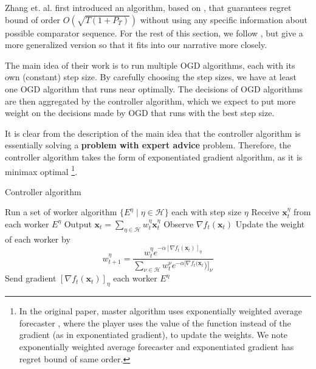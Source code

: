 \documentclass[12pt, a4paper]{report}
\begin{document}
Zhang et. al. \cite{Zhang2018DynamicRO} first introduced an algorithm, based on  \cite{Erven2021MetaGradAU}, that guarantees regret bound of order $O(\sqrt{T(1 + P_T)})$ without using any specific information about possible comparator sequence. For the rest of this section, we follow \cite{Zhang2018DynamicRO}, but give a more generalized version so that it fits into our narrative more closely.

The main idea of their work is to run multiple OGD algorithms, each with its own (constant) step size. By carefully choosing the step sizes, we have at least one OGD algorithm that runs near optimally. The decisions of OGD algorithms are then aggregated by the controller algorithm, which we expect to put more weight on the decisions made by OGD that runs with the best step size. 

It is clear from the description of the main idea that the controller algorithm is essentially solving a \textbf{problem with expert advice} problem. Therefore, the controller algorithm takes the form of exponentiated gradient algorithm, as it is minimax optimal \footnote{In the original paper, master algorithm uses exponentially weighted average forecaster \cite{CesaBianchi2006PredictionLA}, where the player uses the value of the function instead of the gradient (as in exponentiated gradient), to update the weights. We note exponentially weighted average forecaster and exponentiated gradient has regret bound of same order.}.

\begin{algorithm}
\caption{Controller algorithm}\label{ader:controller}
\begin{algorithmic}[1]
\State Run a set of worker algorithm $\{E^{\eta} \mid \eta \in \mathcal{H} \}$ each with step size $\eta$ 
\State Receive $\mathbf{x}_t^{\eta}$ from each worker $E^{\eta}$
\State Output $\displaystyle \mathbf{x}_t = \sum_{\eta \in \mathcal{H}} w_{t}^{\eta} \mathbf{x}_t^{\eta}$
\State Observe $\nabla f_t(\mathbf{x}_t)$
\State Update the weight of each worker by \[
    w_{t+1}^{\eta} = \frac{w_t^{\eta}e^{-\alpha [\nabla f_t(\mathbf{x}_t)]_{\eta}}}{\sum_{\nu \in \mathcal{H}}w_t^{\nu}e^{-\alpha [\nabla f_t(\mathbf{x}_t})]_{\nu}}
\]
\State Send gradient $[\nabla f_t(\mathbf{x}_t)]_{\eta}$ each worker $E^{\eta}$ 
\EndFor
\end{algorithmic}
\end{algorithm}
\end{document}
